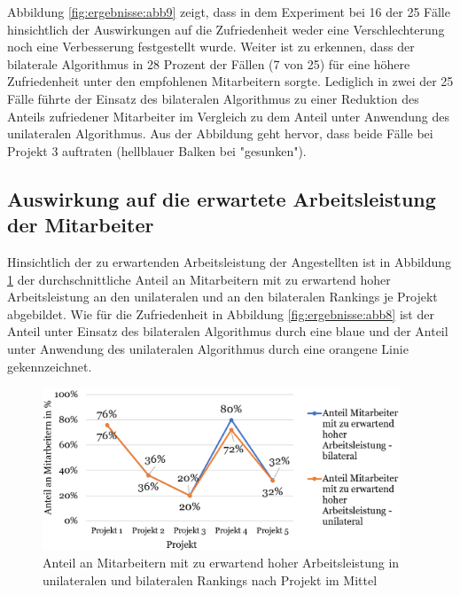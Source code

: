 Abbildung \ref{fig:ergebnisse:abb9} zeigt, dass in dem Experiment bei 16 der 25 Fälle hinsichtlich der Auswirkungen auf die Zufriedenheit weder eine Verschlechterung noch eine Verbesserung festgestellt wurde.
Weiter ist zu erkennen, dass der bilaterale Algorithmus in 28 Prozent der Fällen (7 von 25) für eine höhere Zufriedenheit unter den empfohlenen Mitarbeitern sorgte.
Lediglich in zwei der 25 Fälle führte der Einsatz des bilateralen Algorithmus zu einer Reduktion des Anteils zufriedener Mitarbeiter im Vergleich zu dem Anteil unter Anwendung des unilateralen Algorithmus.
Aus der Abbildung geht hervor, dass beide Fälle bei Projekt 3 auftraten (hellblauer Balken bei "gesunken").


\subsection{Auswirkung auf die erwartete Arbeitsleistung der Mitarbeiter}
Hinsichtlich der zu erwartenden Arbeitsleistung der Angestellten ist in Abbildung \ref{fig:ergebnisse:abb10} der durchschnittliche Anteil an Mitarbeitern mit zu erwartend hoher Arbeitsleistung an den unilateralen und an den bilateralen Rankings je Projekt abgebildet.
Wie für die Zufriedenheit in Abbildung \ref{fig:ergebnisse:abb8} ist der Anteil unter Einsatz des bilateralen Algorithmus durch eine blaue und der Anteil unter Anwendung des unilateralen Algorithmus durch eine orangene Linie gekennzeichnet.

\begin{figure}[H]
    \centering
	\includegraphics[width=0.95\textwidth]{gfx/verhaeltnis-a-durchschnitt-projekte.png}
	\caption[Anteil an Mitarbeitern mit zu erwartend hoher Arbeitsleistung in unilateralen und bilateralen Rankings nach Projekt im Mittel]{Anteil an Mitarbeitern mit zu erwartend hoher Arbeitsleistung in unilateralen und bilateralen Rankings nach Projekt im Mittel}
	\label{fig:ergebnisse:abb10}
\end{figure}

